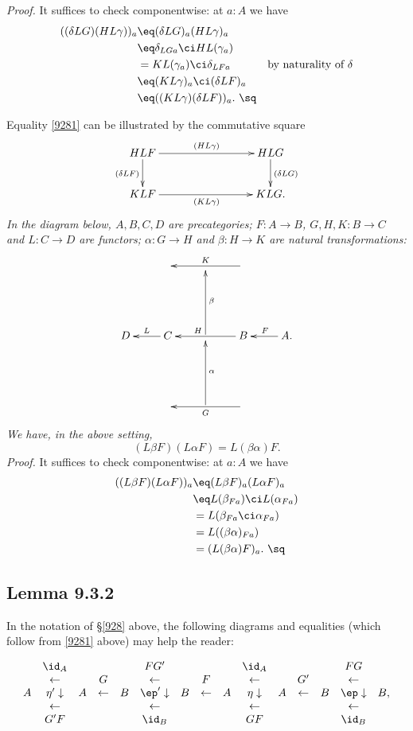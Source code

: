 \documentclass[12pt]{article}
\begin{document}
\nn\emph{Proof.} It suffices to check componentwise: at $a:A$ we have
\begin{align*}
((\delta LG)(HL\gamma))_a
&\eq(\delta LG)_a(HL\gamma)_a\\
&\eq\delta_{LGa}\ci HL(\gamma_a)\\
&=KL(\gamma_a)\ci\delta_{LFa}&\text{by naturality of $\delta$}\\
&\eq(KL\gamma)_a\ci(\delta LF)_a\\
&\eq((KL\gamma)(\delta LF))_a.\ \sq
\end{align*}

Equality \eqref{9281} can be illustrated by the commutative square 
$$
\xymatrix{
HLF\ar[rrr]^{(HL\gamma)}\ar[d]_{(\delta LF)}&&&HLG\ar[d]^{(\delta LG)}\\ 
KLF\ar[rrr]_{(KL\gamma)}&&&KLG.}
$$ 
 \emph{In the diagram below, $A,B,C,D$ are precategories; $F:A\to B$, $G,H,K:B\to C$ and $L:C\to D$ are functors; $\alpha:G\to H$ and $\beta:H\to K$ are natural transformations:
$$
\xymatrix{
&&&\ar[ll]_K\\ \\
D&C\ar[l]_L&\ar[uu]_\beta&B\ar[ll]_(.6)H&A.\ar[l]_F\\ \\
&&\ar[uu]_\alpha&\ar[ll]^G}
$$ 
We have, in the above setting,}
\begin{equation}\label{9282}
(L\beta F)(L\alpha F)=L(\beta\alpha)F.
\end{equation}
\emph{Proof.} It suffices to check componentwise: at $a:A$ we have
\begin{align*}
((L\beta F)(L\alpha F))_a
&\eq(L\beta F)_a(L\alpha F)_a\\
&\eq L(\beta_{Fa})\ci L(\alpha_{Fa})\\
&=L(\beta_{Fa}\ci\alpha_{Fa})\\
&=L((\beta\alpha)_{Fa})\\ 
&=(L(\beta\alpha)F)_a.\ \sq
\end{align*}


\subsection{Lemma 9.3.2}\label{932}

In the notation of \S\ref{928} above, the following diagrams and equalities (which follow from \eqref{9281} above) may help the reader:


$$
\begin{array}{ccccccccccccccc}
&\id_A&&&&FG'&&&&\id_A&&&&FG\\
&\leftarrow&&G&&\leftarrow&&F&&\leftarrow&&G'&&\leftarrow\\
A&\eta'\downarrow&A&\leftarrow&B&\ep'\downarrow&B&\leftarrow&A&\eta\downarrow&A&\leftarrow&B&\ep\downarrow&B,\\
&\leftarrow&&&&\leftarrow&&&&\leftarrow&&&&\leftarrow\\
&G'F&&&&\id_B&&&&GF&&&&\id_B
\end{array}
$$ 
\end{document}
